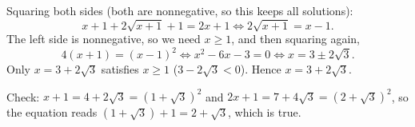 Squaring both sides (both are nonnegative, so this keeps all solutions):
\[x+1+2\sqrt{x+1}+1=2x+1\iff2\sqrt{x+1}=x-1.\]
The left side is nonnegative, so we need $x\ge1$, and then squaring again,
\[4(x+1)=(x-1)^2\iff x^2-6x-3=0\iff x=3\pm2\sqrt3.\]
Only $x=3+2\sqrt3$ satisfies $x\ge1$ ($3-2\sqrt3<0$). Hence $x=\boxed{3+2\sqrt3}$.

Check: $x+1=4+2\sqrt3=\left(1+\sqrt3\right)^2$ and $2x+1=7+4\sqrt3=\left(2+\sqrt3\right)^2$, so the equation reads $\left(1+\sqrt3\right)+1=2+\sqrt3$, which is true.
